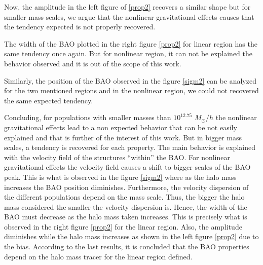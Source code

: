 Now, the amplitude in the left figure of \ref{prop2} recovers a similar shape but
for smaller mass scales, we argue that the nonlinear gravitational effects causes that the tendency
expected is not properly recovered. 	

The width of the BAO plotted in the right figure \ref{prop2} for linear region has the 
same tendency once again. But for nonlinear region, it can not be explained the behavior 
observed and it is out of the scope of this work.

Similarly, the position of the BAO observed in the figure \ref{sigm2} can be analyzed
for the two mentioned regions and in the nonlinear region, we could not recovered the 
same expected tendency. 

Concluding, for populations with smaller masses than $10^{12.75}$ $M_{\odot}/h$ the nonlinear gravitational
effects lead to a non expected behavior that can be not easily explained and that is further
of the interest of this work. But in bigger mass scales, a tendency is recovered for each
property. The main behavior is explained with the velocity field of the structures ``within'' the
BAO. For nonlinear gravitational effects the velocity field causes a shift to bigger scales 
of the BAO peak. This is what is observed in the figure \ref{sigm2} where as the halo mass 
increases the BAO position diminishes. Furthermore, the velocity dispersion of the different
populations depend on the mass scale. Thus, the bigger the halo mass considered the smaller
the velocity dispersion is. Hence, the width of the BAO must decrease as the halo mass taken
increases. This is precisely what is observed in the right figure \ref{prop2} for the linear region. 
Also, the amplitude diminishes while the halo mass increases as shown in the left 
figure \ref{prop2} due to the bias. 
According to the last results, it is concluded that the BAO properties depend on the 
halo mass tracer for the linear region defined. 
